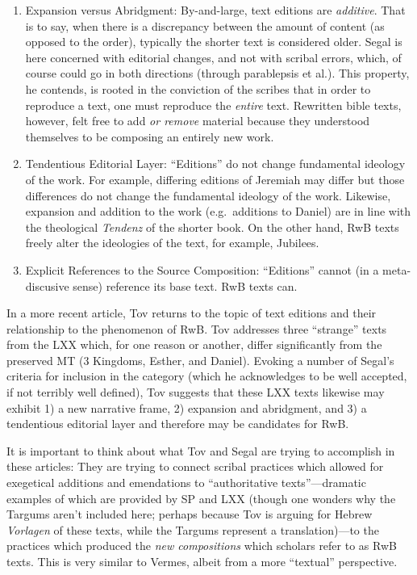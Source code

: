 \begin{enumerate}
\def\labelenumi{\arabic{enumi}.}
\setcounter{enumi}{3}
\item
  Expansion versus Abridgment: By-and-large, text editions are
  \emph{additive}. That is to say, when there is a discrepancy between
  the amount of content (as opposed to the order), typically the shorter
  text is considered older. Segal is here concerned with editorial
  changes, and not with scribal errors, which, of course could go in
  both directions (through parablepsis et al.). This property, he
  contends, is rooted in the conviction of the scribes that in order to
  reproduce a text, one must reproduce the \emph{entire}
  text.\autocite[24]{segal_henze2005} Rewritten bible texts, however,
  felt free to add \emph{or remove} material because they understood
  themselves to be composing an entirely new
  work.\autocite[24]{segal_henze2005}
\item
  Tendentious Editorial Layer: ``Editions'' do not change fundamental
  ideology of the work. For example, differing editions of Jeremiah may
  differ but those differences do not change the fundamental ideology of
  the work. Likewise, expansion and addition to the work (e.g.~additions
  to Daniel) are in line with the theological \emph{Tendenz} of the
  shorter book. On the other hand, RwB texts freely alter the ideologies
  of the text, for example, Jubilees.\autocite[25]{segal_henze2005}
\item
  Explicit References to the Source Composition: ``Editions'' cannot (in
  a meta-discusive sense) reference its base text. RwB texts can.
\end{enumerate}

In a more recent article, Tov returns to the topic of text editions and
their relationship to the phenomenon of
RwB\autocite{tov_krarrer-kraus2008}. Tov addresses three ``strange''
texts from the LXX which, for one reason or another, differ
significantly from the preserved MT (3 Kingdoms, Esther, and Daniel).
Evoking a number of Segal's criteria\autocite{segal_henze2005} for
inclusion in the category (which he acknowledges to be well accepted, if
not terribly well defined), Tov suggests that these LXX texts likewise
may exhibit 1) a new narrative frame, 2) expansion and abridgment, and
3) a tendentious editorial layer and therefore may be candidates for
RwB.

It is important to think about what Tov and Segal are trying to
accomplish in these articles: They are trying to connect scribal
practices which allowed for exegetical additions and emendations to
``authoritative texts''---dramatic examples of which are provided by SP
and LXX (though one wonders why the Targums aren't included here;
perhaps because Tov is arguing for Hebrew \emph{Vorlagen} of these
texts, while the Targums represent a translation)---to the practices
which produced the \emph{new compositions} which scholars refer to as
RwB texts. This is very similar to Vermes, albeit from a more
``textual'' perspective.

